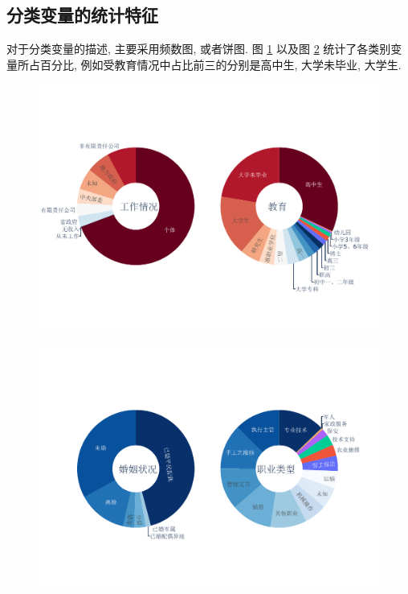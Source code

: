 \documentclass[12pt]{article}
\begin{document}
\subsection{分类变量的统计特征}
对于分类变量的描述, 主要采用频数图, 或者饼图. 
图 \ref{WE} 以及图 \ref{ME} 统计了各类别变量所占百分比, 例如受教育情况中占比前三的分别是高中生, 大学未毕业, 大学生.
\begin{figure}
	\vspace{0cm}
	\setlength{\abovecaptionskip}{-1cm} %
	\setlength{\belowcaptionskip}{-0.5cm} %
	\begin{center}
		\makeatletter
		\def\@captype{figure}
		\makeatother
		\includegraphics[width=6.0in]{images/working_education.pdf}
		\caption{}
		\label{WE}
	\end{center}
\end{figure}

\begin{figure}
	\vspace{-1cm}
	\setlength{\abovecaptionskip}{-1cm} %
	\setlength{\belowcaptionskip}{-0.5cm} %
	\begin{center}
		\makeatletter
		\def\@captype{figure}
		\makeatother
		\includegraphics[width=6.0in]{images/marriage_education.pdf}
		\caption{}
		\label{ME}
	\end{center}
\end{figure}
\end{document}
